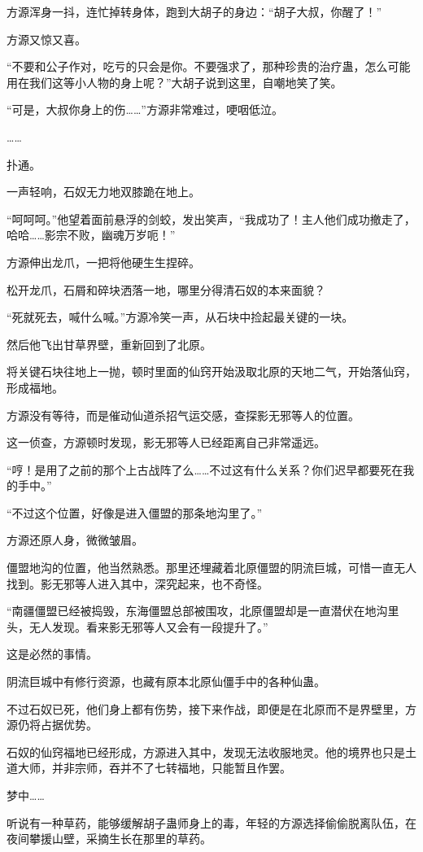 \begin{this_body}
方源浑身一抖，连忙掉转身体，跑到大胡子的身边：“胡子大叔，你醒了！”

方源又惊又喜。

“不要和公子作对，吃亏的只会是你。不要强求了，那种珍贵的治疗蛊，怎么可能用在我们这等小人物的身上呢？”大胡子说到这里，自嘲地笑了笑。

“可是，大叔你身上的伤……”方源非常难过，哽咽低泣。

……

扑通。

一声轻响，石奴无力地双膝跪在地上。

“呵呵呵。”他望着面前悬浮的剑蛟，发出笑声，“我成功了！主人他们成功撤走了，哈哈……影宗不败，幽魂万岁呃！”

方源伸出龙爪，一把将他硬生生捏碎。

松开龙爪，石屑和碎块洒落一地，哪里分得清石奴的本来面貌？

“死就死去，喊什么喊。”方源冷笑一声，从石块中捡起最关键的一块。

然后他飞出甘草界壁，重新回到了北原。

将关键石块往地上一抛，顿时里面的仙窍开始汲取北原的天地二气，开始落仙窍，形成福地。

方源没有等待，而是催动仙道杀招气运交感，查探影无邪等人的位置。

这一侦查，方源顿时发现，影无邪等人已经距离自己非常遥远。

“哼！是用了之前的那个上古战阵了么……不过这有什么关系？你们迟早都要死在我的手中。”

“不过这个位置，好像是进入僵盟的那条地沟里了。”

方源还原人身，微微皱眉。

僵盟地沟的位置，他当然熟悉。那里还埋藏着北原僵盟的阴流巨城，可惜一直无人找到。影无邪等人进入其中，深究起来，也不奇怪。

“南疆僵盟已经被捣毁，东海僵盟总部被围攻，北原僵盟却是一直潜伏在地沟里头，无人发现。看来影无邪等人又会有一段提升了。”

这是必然的事情。

阴流巨城中有修行资源，也藏有原本北原仙僵手中的各种仙蛊。

不过石奴已死，他们身上都有伤势，接下来作战，即便是在北原而不是界壁里，方源仍将占据优势。

石奴的仙窍福地已经形成，方源进入其中，发现无法收服地灵。他的境界也只是土道大师，并非宗师，吞并不了七转福地，只能暂且作罢。

梦中……

听说有一种草药，能够缓解胡子蛊师身上的毒，年轻的方源选择偷偷脱离队伍，在夜间攀援山壁，采摘生长在那里的草药。


\end{this_body}
